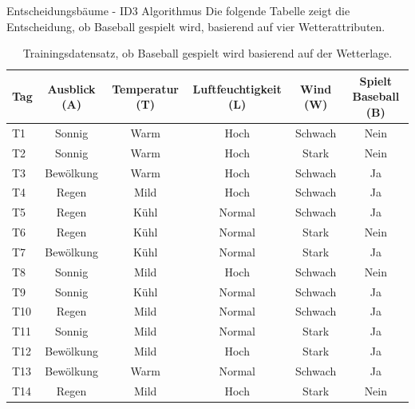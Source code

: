 \begin{task}[credit=16]{Entscheidungsbäume - ID3 Algorithmus}
Die folgende Tabelle zeigt die Entscheidung, ob Baseball gespielt wird, basierend auf vier Wetterattributen.

\begin{table}[h]
\centering
\caption{Trainingsdatensatz, ob Baseball gespielt wird basierend auf der Wetterlage.}
\label{tab:data_baseball}
\begin{tabular}{l|c|c|c|c|c}
\toprule
\textbf{Tag} & \textbf{Ausblick (A)} & \textbf{Temperatur (T)}  & \textbf{Luftfeuchtigkeit (L)} & \textbf{Wind (W)}     & \textbf{Spielt Baseball (B)} \\
\midrule
T1  & Sonnig    & Warm        & Hoch             & Schwach  & Nein            \\
T2  & Sonnig    & Warm        & Hoch             & Stark    & Nein            \\
T3  & Bewölkung & Warm        & Hoch             & Schwach  & Ja              \\
T4  & Regen     & Mild        & Hoch             & Schwach  & Ja              \\
T5  & Regen     & Kühl        & Normal           & Schwach  & Ja              \\
T6  & Regen     & Kühl        & Normal           & Stark    & Nein            \\
T7  & Bewölkung & Kühl        & Normal           & Stark    & Ja              \\
T8  & Sonnig    & Mild        & Hoch             & Schwach  & Nein            \\
T9  & Sonnig    & Kühl        & Normal           & Schwach  & Ja              \\
T10 & Regen     & Mild        & Normal           & Schwach  & Ja              \\
T11 & Sonnig    & Mild        & Normal           & Stark    & Ja              \\
T12 & Bewölkung & Mild        & Hoch             & Stark    & Ja              \\
T13 & Bewölkung & Warm        & Normal           & Schwach  & Ja              \\
T14 & Regen     & Mild        & Hoch             & Stark    & Nein            \\
\bottomrule
\end{tabular}
\end{table}


\end{task}

